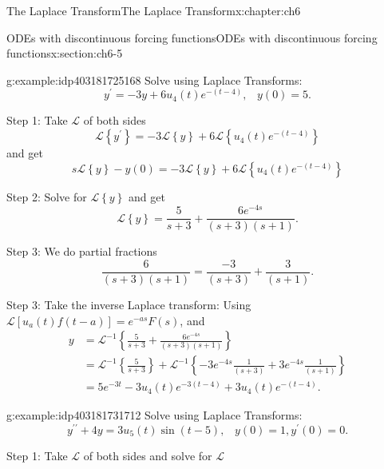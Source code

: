 \documentclass[oneside,10pt,]{book}
\numberwithin{equation}{section}
\numberwithin{equation}{section}
\newcommand{\amp}{&}
\begin{document}
\begin{chapterptx}{The Laplace Transform}{}{The Laplace Transform}{}{}{x:chapter:ch6}
\begin{sectionptx}{ODEs with discontinuous forcing functions}{}{ODEs with discontinuous forcing functions}{}{}{x:section:ch6-5}
\begin{example}{}{g:example:idp403181725168}
Solve using Laplace Transforms:%
\begin{equation*}
y^{\prime}=-3y+6u_{4}(t)e^{-\left(t-4\right)},\,\,\,\,\,y(0)=5.
\end{equation*}
%
\par
Step 1: Take \(\mathcal{L}\) of both sides%
\begin{equation*}
\mathcal{L}\left\{ y^{\prime}\right\} =-3\mathcal{L}\left\{ y\right\} +6\mathcal{L}\left\{ u_{4}(t)e^{-\left(t-4\right)}\right\} 
\end{equation*}
and get%
\begin{equation*}
s\mathcal{L}\left\{ y\right\} -y(0)=-3\mathcal{L}\left\{ y\right\} +6\mathcal{L}\left\{ u_{4}(t)e^{-\left(t-4\right)}\right\} 
\end{equation*}
%
\par
Step 2: Solve for \(\mathcal{L}\left\{ y\right\} \) and get%
\begin{equation*}
\mathcal{L}\left\{ y\right\} =\frac{5}{s+3}+\frac{6e^{-4s}}{\left(s+3\right)\left(s+1\right)}.
\end{equation*}
%
\par
Step 3: We do partial fractions%
\begin{equation*}
\frac{6}{\left(s+3\right)\left(s+1\right)}=\frac{-3}{\left(s+3\right)}+\frac{3}{\left(s+1\right)}.
\end{equation*}
%
\par
Step 3: Take the inverse Laplace transform: Using \(\mathcal{L}\left[u_{a}(t)f(t-a)\right]=e^{-as}F(s)\), and%
\begin{align*}
y \amp =\mathcal{L}^{-1}\left\{ \frac{5}{s+3}+\frac{6e^{-4s}}{\left(s+3\right)\left(s+1\right)}\right\} \\
\amp =\mathcal{L}^{-1}\left\{ \frac{5}{s+3}\right\} +\mathcal{L}^{-1}\left\{ -3e^{-4s}\frac{1}{\left(s+3\right)}+3e^{-4s}\frac{1}{\left(s+1\right)}\right\} \\
\amp =5e^{-3t}-3u_{4}(t)e^{-3\left(t-4\right)}+3u_{4}(t)e^{-\left(t-4\right)}.
\end{align*}
%
\end{example}
\begin{example}{}{g:example:idp403181731712}%
Solve using Laplace Transforms:%
\begin{equation*}
y^{\prime\prime}+4y=3u_{5}(t)\sin\left(t-5\right),\,\,\,\,\,y(0)=1,y^{\prime}(0)=0.
\end{equation*}
%
\par
Step 1: Take \(\mathcal{L}\) of both sides and solve for \(\mathcal{L}\)%
\begin{equation*}

\end{equation*}
\end{example}
\end{sectionptx}
\end{chapterptx}
\end{document}
